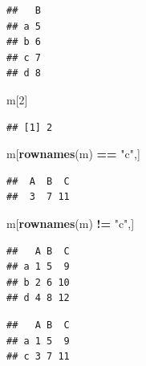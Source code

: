 \documentclass[12pt,]{book}
\newenvironment{Shaded}{\begin{snugshade}}{\end{snugshade}}
\newcommand{\DecValTok}[1]{\textcolor[rgb]{0.00,0.00,0.81}{#1}}
\newcommand{\KeywordTok}[1]{\textcolor[rgb]{0.13,0.29,0.53}{\textbf{#1}}}
\newcommand{\NormalTok}[1]{#1}
\newcommand{\OperatorTok}[1]{\textcolor[rgb]{0.81,0.36,0.00}{\textbf{#1}}}
\newcommand{\StringTok}[1]{\textcolor[rgb]{0.31,0.60,0.02}{#1}}
\begin{document}
\begin{verbatim}
##   B
## a 5
## b 6
## c 7
## d 8
\end{verbatim}

\begin{Shaded}
\begin{Highlighting}[]
\NormalTok{m[}\DecValTok{2}\NormalTok{]}
\end{Highlighting}
\end{Shaded}

\begin{verbatim}
## [1] 2
\end{verbatim}

\begin{Shaded}
\begin{Highlighting}[]
\NormalTok{m[}\KeywordTok{rownames}\NormalTok{(m) }\OperatorTok{==}\StringTok{ "c"}\NormalTok{,]}
\end{Highlighting}
\end{Shaded}

\begin{verbatim}
##  A  B  C 
##  3  7 11
\end{verbatim}

\begin{Shaded}
\begin{Highlighting}[]
\NormalTok{m[}\KeywordTok{rownames}\NormalTok{(m) }\OperatorTok{!=}\StringTok{ "c"}\NormalTok{,]}
\end{Highlighting}
\end{Shaded}

\begin{verbatim}
##   A B  C
## a 1 5  9
## b 2 6 10
## d 4 8 12
\end{verbatim}

\begin{Shaded}
\end{Shaded}

\begin{verbatim}
##   A B  C
## a 1 5  9
## c 3 7 11
\end{verbatim}

\begin{Shaded}
\end{Shaded}
\end{document}
